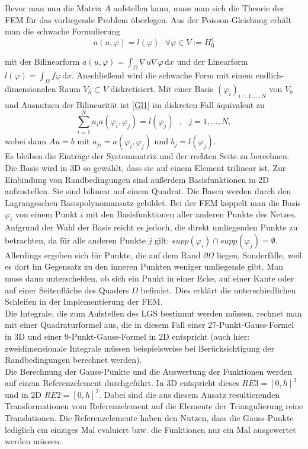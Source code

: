 Bevor man nun die Matrix $A$ aufstellen kann, muss man sich die Theorie der FEM für das vorliegende Problem überlegen. 
Aus der Poisson-Gleichung erhält man die schwache Formulierung 
\begin{equation}
a(u, \varphi)=l( \varphi) \text{ } \forall \varphi \in V:=H^1_0 
\end{equation} \label{Gl1}


mit der Bilinearform $a(u, \varphi)=\int_\Omega \! \nabla u \nabla \varphi \, \mathrm{d}x $ und der Linearform $l( \varphi)= \int_\Omega \! f \varphi \, \mathrm{d}x $. Anschließend wird die schwache Form mit einem endlich-dimensionalen Raum $V_h \subset V$ diskretisiert. Mit einer Basis $(\varphi_i)_{i=1,...,N}$ von $V_h$ und Ausnutzen der Bilinearität ist \eqref{Gl1} im diskreten Fall äquivalent zu 
\begin{equation}
\sum_{i=1}^N u_i a(\varphi_i, \varphi_j)=l(\varphi_j) \text{ } , \text{ } j = 1,...,N,
\end{equation}
wobei dann $A u = b$ mit $a_{ji}=a(\varphi_i, \varphi_j)$ und $b_j=l(\varphi_j)$. \\

Es bleiben die Einträge der Systemmatrix und der rechten Seite zu berechnen. 
Die Basis  wird in 3D so gewählt, dass sie auf einem Element trilinear ist. Zur Einbindung von Randbedingungen sind außerdem Basisfunktionen in 2D aufzustellen. Sie sind bilinear auf einem Quadrat. Die Basen werden durch den Lagrangeschen Basispolynomansatz gebildet. Bei der FEM koppelt man die Basis $\varphi_i$ von einem Punkt $i$ mit den Basisfunktionen aller anderen Punkte des Netzes. Aufgrund der Wahl der Basis reicht es jedoch, die direkt umliegenden Punkte zu betrachten, da für alle anderen Punkte $j$ gilt: $supp(\varphi_i) \cap supp(\varphi_j) = \emptyset$. Allerdings ergeben sich für Punkte, die auf dem Rand $\partial \Omega$ liegen, Sonderfälle, weil es dort im Gegensatz zu den inneren Punkten weniger umliegende gibt. Man muss dann unterscheiden, ob sich ein Punkt in einer Ecke, auf einer Kante oder auf einer Seitenfläche des Quaders $\Omega$ befindet. Dies erklärt die unterschiedlichen Schleifen in der Implementierung der FEM. \\
Die Integrale, die zum Aufstellen des LGS bestimmt werden müssen, rechnet man mit einer Quadraturformel aus, die in diesem Fall einer 27-Punkt-Gauss-Formel in 3D und einer 9-Punkt-Gauss-Formel in 2D entspricht (auch hier: zweidimensionale Integrale müssen beispielsweise bei Berücksichtigung der Randbedingungen berechnet werden). \\
Die Berechnung der Gauss-Punkte und die Auswertung der Funktionen werden auf einem Referenzelement durchgeführt. In 3D entspricht dieses $RE3=[0,h]^3$ und in 2D $RE2=[0,h]^2$. Dabei sind die aus diesem Ansatz resultierenden Transformationen vom Referenzelement auf die Elemente der Triangulierung reine Translationen. Die Referenzelemente haben den Nutzen, dass die Gauss-Punkte lediglich ein einziges Mal evaluiert bzw. die Funktionen nur ein Mal ausgewertet werden müssen.   \\

